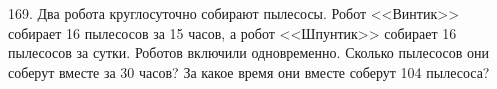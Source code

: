 169. Два робота круглосуточно собирают пылесосы. Робот <<Винтик>> собирает 16 пылесосов за 15 часов, а робот <<Шпунтик>> собирает 16 пылесосов за сутки. Роботов включили одновременно. Сколько пылесосов они соберут вместе за 30 часов? За какое время они вместе соберут 104 пылесоса?\\
